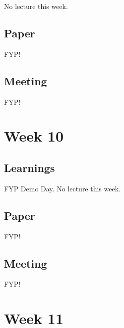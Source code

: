 No lecture this week.

\section{Paper}

FYP!

\section{Meeting}

FYP!

\chapter{Week 10}

\section{Learnings}

FYP Demo Day. No lecture this week.

\section{Paper}

FYP!

\section{Meeting}

FYP!

\chapter{Week 11}

